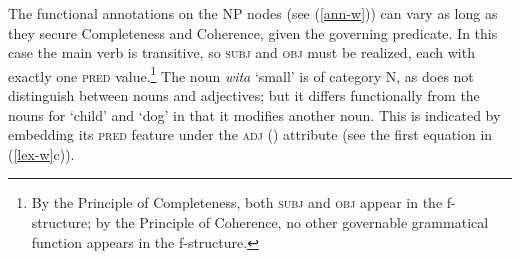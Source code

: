 \ea
\label{fs-w} 
\z
The functional annotations on the NP nodes (see (\ref{ann-w})) can vary as long as they secure Completeness and Coherence, given the governing predicate.  In this case the main verb is transitive, so \textsc{subj} and \textsc{obj} must be realized, each with exactly one \textsc{pred} value.\footnote{By the Principle of Completeness, both \textsc{subj} and \textsc{obj} appear in the f-structure; by the Principle of Coherence, no other governable grammatical function appears in the f-structure.}  The noun \textit{wita} `small' is of category N, as  does not distinguish between nouns and adjectives; but it differs functionally from the nouns for `child' and `dog' in that it modifies another noun.  This is indicated by embedding its \textsc{pred} feature under the \textsc{adj} () attribute (see the first equation in (\ref{lex-w}c)).


